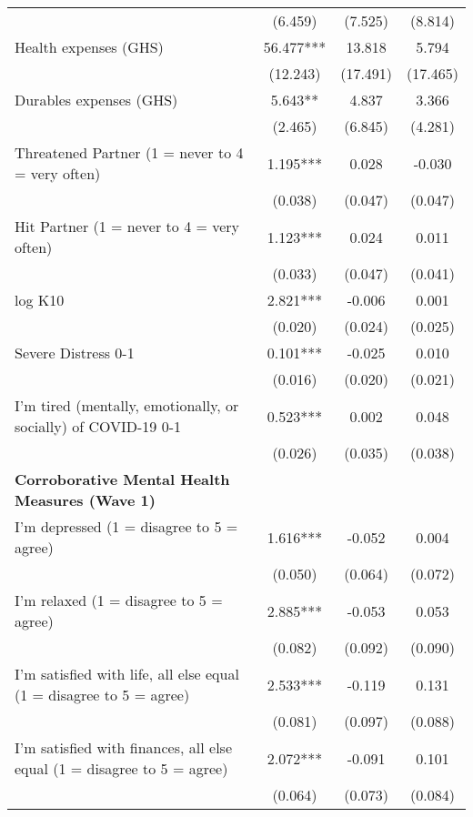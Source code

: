 \begin{tabular}{lccc}
                   &      (6.459)     &      (7.525)     &      (8.814)     \\ [0.1em] 
 Health expenses (GHS) & 56.477*** & 13.818 & 5.794 \\ [0.1em] 
                   &      (12.243)     &      (17.491)     &      (17.465)     \\ [0.1em] 
 Durables expenses (GHS) & 5.643** & 4.837 & 3.366 \\ [0.1em] 
                   &      (2.465)     &      (6.845)     &      (4.281)     \\ [0.1em] 
 Threatened Partner (1 = never to 4 = very often) & 1.195*** & 0.028 & -0.030 \\ [0.1em] 
                   &      (0.038)     &      (0.047)     &      (0.047)     \\ [0.1em] 
 Hit Partner (1 = never to 4 = very often) & 1.123*** & 0.024 & 0.011 \\ [0.1em] 
                   &      (0.033)     &      (0.047)     &      (0.041)     \\ [0.1em] 
 log K10 & 2.821*** & -0.006 & 0.001 \\ [0.1em] 
                   &      (0.020)     &      (0.024)     &      (0.025)     \\ [0.1em] 
 Severe Distress 0-1 & 0.101*** & -0.025 & 0.010 \\ [0.1em] 
                   &      (0.016)     &      (0.020)     &      (0.021)     \\ [0.1em] 
 I'm tired (mentally, emotionally, or socially) of COVID-19 0-1 & 0.523*** & 0.002 & 0.048 \\ [0.1em] 
                   &      (0.026)     &      (0.035)     &      (0.038)     \\ [0.1em] 
\textbf{Corroborative Mental Health Measures (Wave 1)} & & & \\ 
 I'm depressed (1 = disagree to 5 = agree) & 1.616*** & -0.052 & 0.004 \\ [0.1em] 
                   &      (0.050)     &      (0.064)     &      (0.072)     \\ [0.1em] 
 I'm relaxed (1 = disagree to 5 = agree) & 2.885*** & -0.053 & 0.053 \\ [0.1em] 
                   &      (0.082)     &      (0.092)     &      (0.090)     \\ [0.1em] 
 I'm satisfied with life, all else equal (1 = disagree to 5 = agree) & 2.533*** & -0.119 & 0.131 \\ [0.1em] 
                   &      (0.081)     &      (0.097)     &      (0.088)     \\ [0.1em] 
 I'm satisfied with finances, all else equal (1 = disagree to 5 = agree) & 2.072*** & -0.091 & 0.101 \\ [0.1em] 
                   &      (0.064)     &      (0.073)     &      (0.084)     \\ [0.1em] 
\hline\hline
\end{tabular}
